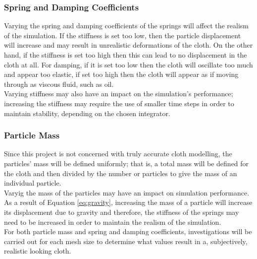 \subsubsection{Spring and Damping Coefficients}
Varying the spring and damping coefficients of the springs will affect the realism of the simulation. If the stiffness is set too low, then the particle displacement will increase and may result in unrealistic deformations of the cloth. On the other hand, if the stiffness is set too high then this can lead to no displacement in the cloth at all. For damping, if it is set too low then the cloth will oscillate too much and appear too elastic, if set too high then the cloth will appear as if moving through as viscous fluid, such as oil.
\\Varying stiffness may also have an impact on the simulation's performance; increasing the stiffness may require the use of smaller time steps in order to maintain stability, depending on the chosen integrator.

\subsubsection{Particle Mass}
Since this project is not concerned with truly accurate cloth modelling, the particles' mass will be defined uniformly; that is, a total mass will be defined for the cloth and then divided by the number or particles to give the mass of an individual particle.
\\Varyig the mass of the particles may have an impact on simulation performance. As a result of Equation \ref{eq:gravity}, increasing the mass of a particle will increase its displacement due to gravity and therefore, the stiffness of the springs may need to be increased in order to maintain the realism of the simulation. 
\\For both particle mass and spring and damping coefficients, investigations will be carried out for each mesh size to determine what values result in a, subjectively, realistic looking cloth.


